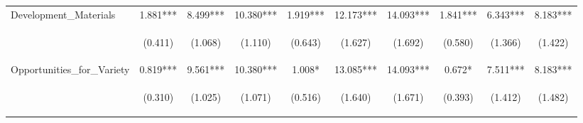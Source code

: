 \begin{tabular}{lccccccccc}
\noalign{\smallskip}Development_Materials & 1.881*** & 8.499*** & 10.380*** & 1.919*** & 12.173*** & 14.093*** & 1.841*** & 6.343*** & 8.183***\\
 & \begin{footnotesize}(0.411)\end{footnotesize} & \begin{footnotesize}(1.068)\end{footnotesize} & \begin{footnotesize}(1.110)\end{footnotesize} & \begin{footnotesize}(0.643)\end{footnotesize} & \begin{footnotesize}(1.627)\end{footnotesize} & \begin{footnotesize}(1.692)\end{footnotesize} & \begin{footnotesize}(0.580)\end{footnotesize} & \begin{footnotesize}(1.366)\end{footnotesize} & \begin{footnotesize}(1.422)\end{footnotesize}\\
\noalign{\smallskip}Opportunities_for_Variety & 0.819*** & 9.561*** & 10.380*** & 1.008* & 13.085*** & 14.093*** & 0.672* & 7.511*** & 8.183***\\
 & \begin{footnotesize}(0.310)\end{footnotesize} & \begin{footnotesize}(1.025)\end{footnotesize} & \begin{footnotesize}(1.071)\end{footnotesize} & \begin{footnotesize}(0.516)\end{footnotesize} & \begin{footnotesize}(1.640)\end{footnotesize} & \begin{footnotesize}(1.671)\end{footnotesize} & \begin{footnotesize}(0.393)\end{footnotesize} & \begin{footnotesize}(1.412)\end{footnotesize} & \begin{footnotesize}(1.482)\end{footnotesize}\\

\end{tabular}
